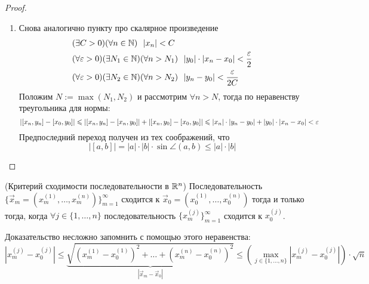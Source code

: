 \begin{proof}
\begin{enumerate}
		\item Снова аналогично пункту про скалярное произведение
		\begin{align*}
			&(\exists C > 0)(\forall n \in \mathbb{N})\ \ |x_n| < C
			\\
			&(\forall \varepsilon > 0)(\exists N_1 \in \mathbb{N})
			(\forall n > N_1)\ \ |y_0| \cdot |x_n - x_0|
			< \frac{\varepsilon}{2}
			\\
			&(\forall \varepsilon > 0)(\exists N_2 \in \mathbb{N})
			(\forall n > N_2)\ \ |y_n - y_0| < \frac{\varepsilon}{2C}
		\end{align*}
		Положим $N := \max(N_1, N_2)$ и рассмотрим $\forall n > N$,
		тогда по неравенству треугольника для нормы:
		\[
			|[x_n, y_n] - [x_0, y_0]| \leqslant |[x_n, y_n] -
			[x_n, y_0]| + |[x_n, y_0] - [x_0, y_0]| \leqslant
			|x_n| \cdot |y_n - y_0| + |y_0| \cdot |x_n - x_0| < \varepsilon
		\]
		Предпоследний переход получен из тех соображений, что
		\[
			|[a, b]| = |a| \cdot |b| \cdot \sin \angle(a, b)
			\le |a| \cdot |b|
		\]
	\end{enumerate}
\end{proof}

\begin{lemma} (Критерий сходимости последовательности в $\mathbb{R}^n$) \label{limCoordinates}
	Последовательность $\{\vec{x}_m = (x_m^{(1)},
	\ldots, x_m^{(n)})\}_{m = 1}^\infty$ сходится
	к $\vec{x}_0 = (x_0^{(1)}, \ldots, x_0^{(n)})$
	тогда и только тогда, когда $\forall j \in
	\{1, \ldots, n\}$ последовательность
	$\{x_m^{(j)}\}_{m = 1}^\infty$ сходится к $x_0^{(j)}$.
\end{lemma}

\begin{idea}
	Доказательство несложно запомнить с помощью этого неравенства:
	\[
		|x_m^{(j)} - x_0^{(j)}| \le
		\underbrace{\sqrt{(x_m^{(1)} - x_0^{(1)})^2 +
		\ldots + (x_m^{(n)} - x_0^{(n)})^2}}_{|\vec{x}_m - \vec{x}_0|}
		\le \left(\max\limits_{j \in \{1, \ldots, n\}}
		|x_m^{(j)} - x_0^{(j)}|\right) \cdot \sqrt{n} 
	\]
\end{idea}

